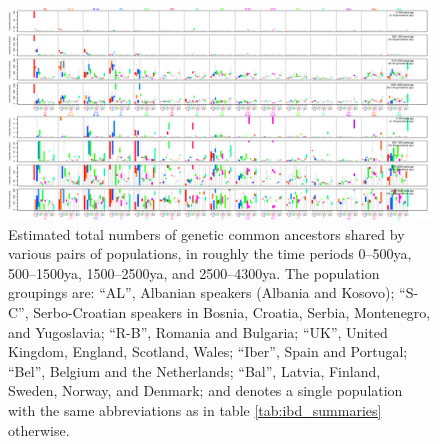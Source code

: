 \documentclass{article}
\begin{document}
\begin{figure}[!htp]
  \begin{center}
    
    \vspace{2em}
    \begin{center}
      \includegraphics[angle=90,height=.9\textheight]{inversion-boxplots-long}
    \end{center}
    \vspace{2em}
    \caption{
    Estimated total numbers of genetic common ancestors shared by various pairs of populations,
    in roughly the time periods 0--500ya, 500--1500ya, 1500--2500ya, and 2500--4300ya.
    The population groupings are:
    ``AL'', Albanian speakers (Albania and Kosovo);
    ``S-C'', Serbo-Croatian speakers in Bosnia, Croatia, Serbia, Montenegro, and Yugoslavia;
    ``R-B'', Romania and Bulgaria;
    ``UK'', United Kingdom, England, Scotland, Wales;
    ``Iber'', Spain and Portugal;
    ``Bel'', Belgium and the Netherlands;
    ``Bal'', Latvia, Finland, Sweden, Norway, and Denmark;
    and denotes a single population with the same abbreviations as in table \ref{tab:ibd_summaries} otherwise.
    \label{sfig:inversion_boxplots_long}
    }
  \end{center}
\end{figure}
\end{document}

